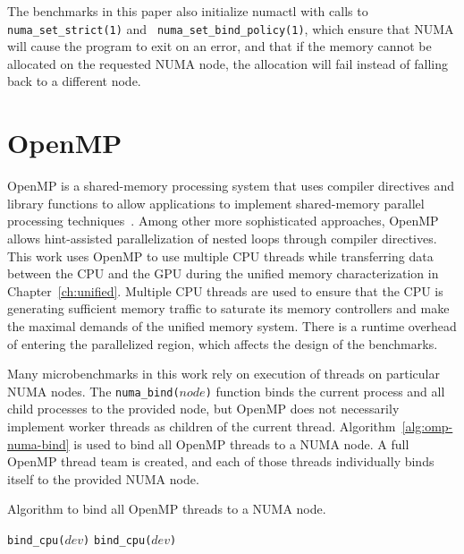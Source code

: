 The benchmarks in this paper also initialize numactl with calls to \texttt{numa\_set\_strict(1)} and \texttt{ numa\_set\_bind\_policy(1)}, which ensure that NUMA will cause the program to exit on an error, and that if the memory cannot be allocated on the requested NUMA node, the allocation will fail instead of falling back to a different node.

\section{OpenMP}
\label{sec:openmp}

OpenMP is a shared-memory processing system that uses compiler directives and library functions to allow applications to implement shared-memory parallel processing techniques~\cite{openmp2013}.
Among other more sophisticated approaches, OpenMP allows hint-assisted parallelization of nested loops through compiler directives.
This work uses OpenMP to use multiple CPU threads while transferring data between the CPU and the GPU during the unified memory characterization in Chapter~\ref{ch:unified}. 
Multiple CPU threads are used to ensure that the CPU is generating sufficient memory traffic to saturate its memory controllers and make the maximal demands of the unified memory system.
There is a runtime overhead of entering the parallelized region, which affects the design of the benchmarks.

Many microbenchmarks in this work rely on execution of threads on particular NUMA nodes.
The \texttt{numa\_bind($node$)} function binds the current process and all child processes to the provided node, but OpenMP does not necessarily implement worker threads as children of the current thread.
Algorithm~\ref{alg:omp-numa-bind} is used to bind all OpenMP threads to a NUMA node.
A full OpenMP thread team is created, and each of those threads individually binds itself to the provided NUMA node.

\begin{algorithm}
	\caption[Bind OpenMP threads to a NUMA node]{
		Algorithm to bind all OpenMP threads to a NUMA node.
	}
	\label{alg:omp-numa-bind}
	\begin{algorithmic}[1]
		\Statex
        \State \texttt{bind\_cpu($dev$)}
        \State \texttt{bind\_cpu($dev$)}
        \EndFor
        \EndFunction
		
	\end{algorithmic}
\end{algorithm}

